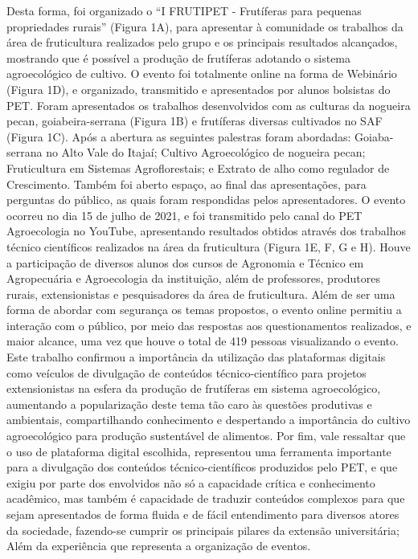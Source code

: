 Desta forma, foi organizado o “I FRUTIPET - Frutíferas para pequenas propriedades 
rurais” (Figura 1A), para apresentar à comunidade os trabalhos da área de fruticultura realizados 
pelo grupo e os principais resultados alcançados, mostrando que é possível a produção de frutíferas 
adotando o sistema agroecológico de cultivo. O evento foi totalmente online na forma de 
Webinário (Figura 1D), e organizado, transmitido e apresentados por alunos bolsistas do PET.
Foram apresentados os trabalhos desenvolvidos com as culturas da nogueira pecan, 
goiabeira-serrana (Figura 1B) e frutíferas diversas cultivados no SAF (Figura 1C). Após a abertura 
as seguintes palestras foram abordadas: Goiaba-serrana no Alto Vale do Itajaí; Cultivo 
Agroecológico de nogueira pecan; Fruticultura em Sistemas Agroflorestais; e Extrato de alho 
como regulador de Crescimento. Também foi aberto espaço, ao final das apresentações, para 
perguntas do público, as quais foram respondidas pelos apresentadores.
O evento ocorreu no dia 15 de julho de 2021, e foi transmitido pelo canal do PET 
Agroecologia no YouTube, apresentando resultados obtidos através dos trabalhos técnicocientíficos realizados na área da fruticultura (Figura 1E, F, G e H). 
Houve a participação de diversos alunos dos cursos de Agronomia e Técnico em 
Agropecuária e Agroecologia da instituição, além de professores, produtores rurais, extensionistas 
e pesquisadores da área de fruticultura. Além de ser uma forma de abordar com segurança os temas 
propostos, o evento online permitiu a interação com o público, por meio das respostas aos 
questionamentos realizados, e maior alcance, uma vez que houve o total de 419 pessoas 
visualizando o evento.
Este trabalho confirmou a importância da utilização das plataformas digitais como veículos 
de divulgação de conteúdos técnico-científico para projetos extensionistas na esfera da produção 
de frutíferas em sistema agroecológico, aumentando a popularização deste tema tão caro às 
questões produtivas e ambientais, compartilhando conhecimento e despertando a importância do 
cultivo agroecológico para produção sustentável de alimentos.
Por fim, vale ressaltar que o uso de plataforma digital escolhida, representou uma 
ferramenta importante para a divulgação dos conteúdos técnico-científicos produzidos pelo PET, 
e que exigiu por parte dos envolvidos não só a capacidade crítica e conhecimento acadêmico, mas 
também é capacidade de traduzir conteúdos complexos para que sejam apresentados de forma 
fluida e de fácil entendimento para diversos atores da sociedade, fazendo-se cumprir os principais 
pilares da extensão universitária; Além da experiência que representa a organização de eventos.

